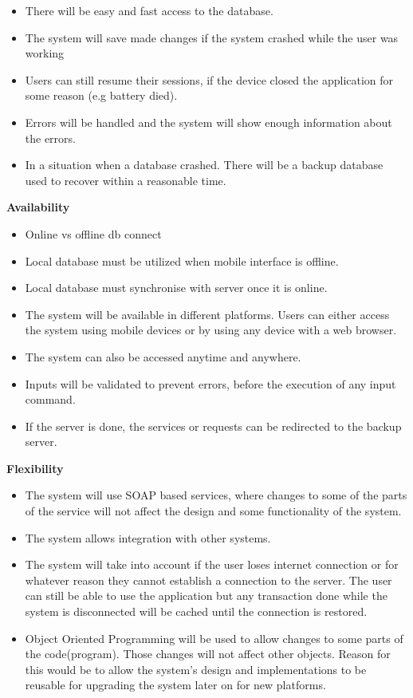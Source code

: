 \documentclass[10pt,a4paper]{article}
\begin{document}
	\begin{itemize}
		\item There will be easy and fast access to the database.
		\item The system will save made changes if the system crashed while the user was working
		\item Users can still resume their sessions, if the device closed the application for some reason (e.g battery died).
		\item Errors will be handled and the system will show enough information about the errors.
		\item In a situation when a database crashed. There will be a backup database used to recover within a reasonable time.
	\end{itemize}
	\pagebreak
\indent\indent\textbf{Availability}       
        \begin{itemize}
                \item Online vs offline db connect
                \item Local database must be utilized when mobile interface is offline.
                \item Local database must synchronise with server once it is online.
                
		\item The system will be available in different platforms. Users can either access the system using mobile devices or by using any device with a web browser.
		\item The system can also be accessed anytime and anywhere.
		\item Inputs will be validated to prevent errors, before the execution of any input command.
		\item If the server is done, the services or requests can be redirected to the backup server.
	 
        \end{itemize}   
                                                      
\indent\textbf{Flexibility}         
        \begin{itemize}
                \item The system will use SOAP based services, where changes to some of the parts of the service will not affect the design and some functionality of the system.
		\item The system allows integration with other systems.
		\item The system will take into account if the user loses internet connection or for whatever reason they cannot establish a connection to the server. The user can still be able to use the application but any transaction done while the system is disconnected will be cached until the connection is restored.
		\item Object Oriented Programming will be used to allow changes to some parts of the code(program). Those changes will not affect other objects. Reason for this would be to allow the system's design and implementations to be reusable for upgrading the system later on for new platforms.
        \end{itemize}   
\end{document}
